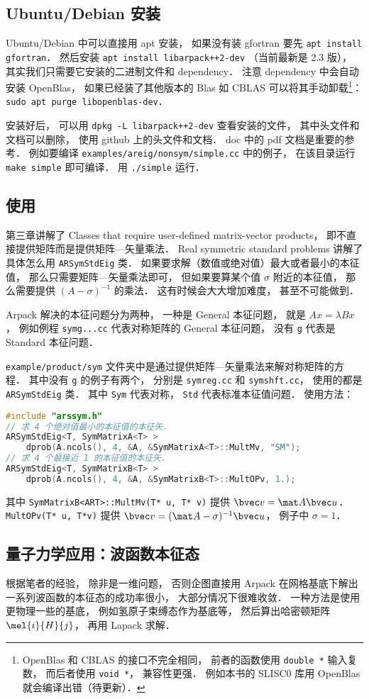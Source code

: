 \subsection{Ubuntu/Debian 安装}
Ubuntu/Debian 中可以直接用 apt 安装， 如果没有装 gfortran 要先 \verb|apt install gfortran|． 然后安装 \verb|apt install libarpack++2-dev| （当前最新是 2.3 版）， 其实我们只需要它安装的二进制文件和 dependency． 注意 dependency 中会自动安装 OpenBlas， 如果已经装了其他版本的 Blas 如 CBLAS 可以将其手动卸载\footnote{OpenBlas 和 CBLAS 的接口不完全相同， 前者的函数使用 \lstinline|double *| 输入复数， 而后者使用 \lstinline|void *|， 兼容性更强． 例如本书的 SLISC0 库用 OpenBlas 就会编译出错（待更新）．}： \verb|sudo apt purge libopenblas-dev|．

安装好后， 可以用 \verb|dpkg -L libarpack++2-dev| 查看安装的文件， 其中头文件和文档可以删除， 使用 github 上的头文件和文档． doc 中的 pdf 文档是重要的参考． 例如要编译 \verb|examples/areig/nonsym/simple.cc| 中的例子， 在该目录运行 \verb|make simple| 即可编译． 用 \verb|./simple| 运行．

\subsection{使用}
第三章讲解了 Classes that require user-defined matrix-vector products， 即不直接提供矩阵而是提供矩阵—矢量乘法． Real symmetric standard problems 讲解了具体怎么用 \verb|ARSymStdEig| 类． 如果要求解（数值或绝对值）最大或者最小的本征值， 那么只需要矩阵—矢量乘法即可， 但如果要算某个值 $\sigma$ 附近的本征值， 那么需要提供 $(A - \sigma)^{-1}$ 的乘法． 这有时候会大大增加难度， 甚至不可能做到．

Arpack 解决的本征问题分为两种， 一种是 General 本征问题， 就是 $Ax = \lambda Bx$， 例如例程 \verb|symg...cc| 代表对称矩阵的 General 本征问题， 没有 \verb|g| 代表是 Standard 本征问题．

\verb|example/product/sym| 文件夹中是通过提供矩阵—矢量乘法来解对称矩阵的方程． 其中没有 \verb|g| 的例子有两个， 分别是 \verb|symreg.cc| 和 \verb|symshft.cc|， 使用的都是 \verb|ARSymStdEig| 类． 其中 \verb|Sym| 代表对称， \verb|Std| 代表标准本征值问题． 使用方法：
\begin{lstlisting}[language=cpp]
#include "arssym.h"
// 求 4 个绝对值最小的本征值的本征矢．
ARSymStdEig<T, SymMatrixA<T> >
    dprob(A.ncols(), 4, &A, &SymMatrixA<T>::MultMv, "SM");
// 求 4 个最接近 1 的本征值的本征矢．
ARSymStdEig<T, SymMatrixB<T> >
    dprob(A.ncols(), 4, &A, &SymMatrixB<T>::MultOPv, 1.);
\end{lstlisting}
其中 \verb|SymMatrixB<ART>::MultMv(T* u, T* v)| 提供 $\bvec v = \mat A\bvec u$． \verb|MultOPv(T* u, T*v)| 提供 $\bvec v = (\mat A - \sigma)^{-1}\bvec u$， 例子中 $\sigma = 1$．

\subsection{量子力学应用：波函数本征态}
根据笔者的经验， 除非是一维问题， 否则企图直接用 Arpack 在网格基底下解出一系列波函数的本征态的成功率很小， 大部分情况下很难收敛． 一种方法是使用更物理一些的基底， 例如氢原子束缚态作为基底等， 然后算出哈密顿矩阵 $\mel{i}{H}{j}$， 再用 Lapack 求解．
